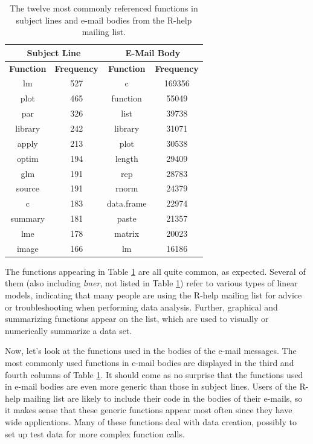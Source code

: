 \documentclass[12pt, a4paper, oneside]{amsart}
\begin{document}
 \begin{table}[ht]
 \centering
 \begin{tabular}{|c|c||c|c|}
 \hline
\multicolumn{2}{|c||}{Subject Line} & \multicolumn{2}{|c|}{E-Mail Body}\\
\hline
\footnotesize{\textbf{Function}}& \footnotesize{\textbf{Frequency}} & \footnotesize{\textbf{Function}}& \footnotesize{\textbf{Frequency}}\\
\hline
lm & 527 & c & 169356 \\
plot & 465 & function & 55049\\
par & 326 & list & 39738\\
library & 242 & library & 31071\\
apply & 213 & plot & 30538\\
optim & 194 & length & 29409\\
glm & 191 & rep & 28783\\
source & 191 & rnorm & 24379\\
c & 183 & data.frame & 22974\\
summary & 181 & paste & 21357\\
lme & 178 & matrix & 20023\\
image & 166 & lm & 16186\\
\hline
\end{tabular}
\caption{The twelve most commonly referenced functions in subject lines and e-mail bodies from the R-help mailing list.}
\label{table:allFcns}
\end{table}

The functions appearing in Table \ref{table:allFcns} are all quite common, as expected.  Several of them (also including \textit{lmer}, not listed in Table \ref{table:allFcns}) refer to various types of linear models, indicating that many people are using the R-help mailing list for advice or troubleshooting when performing data analysis.  Further, graphical and summarizing functions appear on the list, which are used to visually or numerically summarize a data set.

Now, let's look at the functions used in the bodies of the e-mail messages.  The most commonly used functions in e-mail bodies are displayed in the third and fourth columns of Table \ref{table:allFcns}.  It should come as no surprise that the functions used in e-mail bodies are even more generic than those in subject lines.  Users of the R-help mailing list are likely to include their code in the bodies of their e-mails, so it makes sense that these generic functions appear most often since they have wide applications.  Many of these functions deal with data creation, possibly to set up test data for more complex function calls.

 
\end{document}
